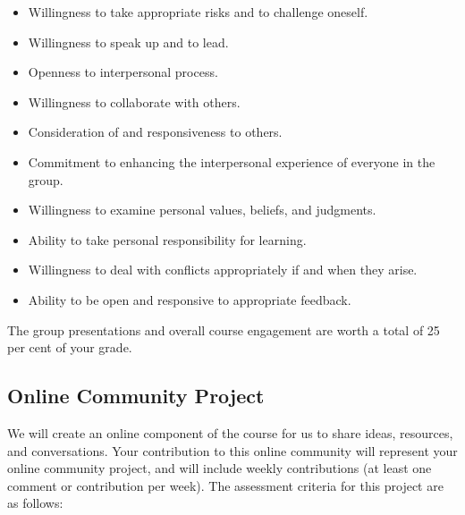 \documentclass[letterpaper,10pt,headsepline]{scrreprt}
\begin{document}
\begin{itemize}
\item Willingness to take appropriate risks and to challenge oneself.
\item Willingness to speak up and to lead.
\item Openness to interpersonal process.
\item Willingness to collaborate with others.
\item Consideration of and responsiveness to others.
\item Commitment to enhancing the interpersonal experience of everyone in the group.
\item Willingness to examine personal values, beliefs, and judgments.
\item Ability to take personal responsibility for learning.
\item Willingness to deal with conflicts appropriately if and when they arise.
\item Ability to be open and responsive to appropriate feedback.
 
\end{itemize}

The group presentations and overall course engagement are worth a total of 25 per cent of your grade.

\subsection{Online Community Project}

We will create an online component of the course for us to share ideas, resources, and conversations. Your contribution to this online community will represent your online community project, and will include weekly contributions (at least one comment or contribution per week). The assessment criteria for this project are as follows:
\end{document}
